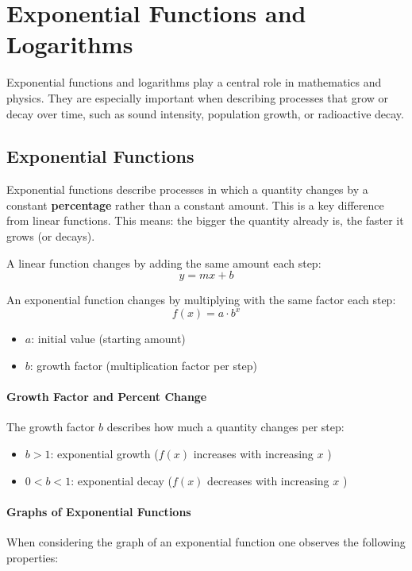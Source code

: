 \section{Exponential Functions and Logarithms}

Exponential functions and logarithms play a central role in mathematics and physics. They are especially important when describing processes that grow or decay over time, such as sound intensity, population growth, or radioactive decay.

\subsection{Exponential Functions}

Exponential functions describe processes in which a quantity changes by a constant \textbf{percentage} rather than a constant amount. This is a key difference from linear functions. This means: the bigger the quantity already is, the faster it grows (or decays).

A linear function changes by adding the same amount each step:
\begin{equation}
    y = mx + b
\end{equation}

An exponential function changes by multiplying with the same factor each step:
\begin{equation}
    f(x) = a \cdot b^x
\end{equation}

\begin{itemize}
    \item $a$: initial value (starting amount)
    \item $b$: growth factor (multiplication factor per step)
\end{itemize}

\paragraph{Growth Factor and Percent Change}

The growth factor $b$ describes how much a quantity changes per step:
\begin{itemize}
    \item $b > 1$: exponential growth ($f(x)$ increases with increasing $x$ )
    \item $0 < b < 1$: exponential decay ($f(x)$ decreases with increasing $x$ )
\end{itemize}

\paragraph{Graphs of Exponential Functions}
When considering the graph of an exponential function one observes the following properties:

